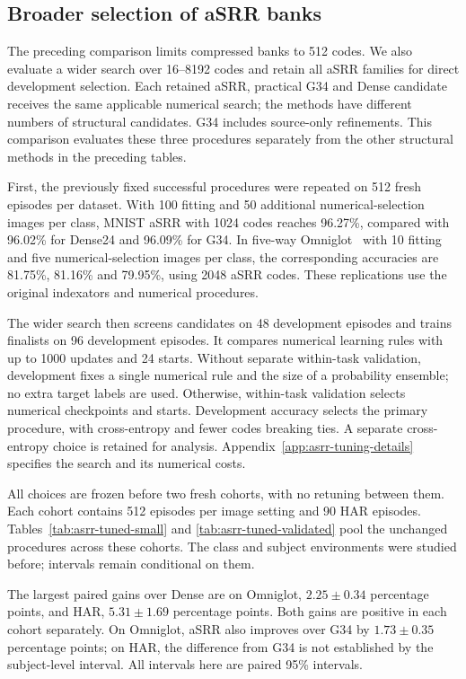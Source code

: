 \FloatBarrier
\subsection{Broader selection of aSRR banks}
\label{sec:asrr-broader}

The preceding comparison limits compressed banks to 512 codes. We also
evaluate a wider search over 16--8192 codes and retain all aSRR families
for direct development selection. Each retained aSRR, practical G34 and
Dense candidate receives the same applicable numerical search; the
methods have different numbers of structural candidates. G34 includes
source-only refinements. This comparison evaluates these three procedures
separately from the other structural methods in the preceding tables.

First, the previously fixed successful procedures were repeated on
512 fresh episodes per dataset. With 100 fitting and 50 additional
numerical-selection images per class, MNIST aSRR with 1024 codes reaches 96.27\%,
compared with 96.02\% for Dense24 and 96.09\% for G34. In five-way
Omniglot~\cite{lake2015human} with 10 fitting and five numerical-selection
images per class,
the corresponding accuracies are 81.75\%, 81.16\% and 79.95\%,
using 2048 aSRR codes.
These replications use the original indexators and numerical procedures.

The wider search then screens candidates on 48 development episodes
and trains finalists on 96 development episodes. It compares numerical
learning rules with up to 1000 updates and 24 starts. Without separate
within-task validation, development fixes a single numerical rule and
the size of a probability ensemble; no extra target labels are used.
Otherwise, within-task validation selects numerical checkpoints and
starts. Development accuracy selects the primary procedure, with
cross-entropy and fewer codes breaking ties. A separate cross-entropy
choice is retained for analysis. Appendix~\ref{app:asrr-tuning-details}
specifies the search and its numerical costs.

All choices are frozen before two fresh cohorts, with no retuning between
them. Each cohort contains 512 episodes per image setting and 90 HAR
episodes. Tables~\ref{tab:asrr-tuned-small} and
\ref{tab:asrr-tuned-validated} pool the unchanged procedures across
these cohorts. The class and subject environments were studied before;
intervals remain conditional on them.

\FloatBarrier

The largest paired gains over Dense are on Omniglot,
$2.25\pm0.34$ percentage points, and HAR, $5.31\pm1.69$ percentage
points. Both gains are positive in each cohort separately. On Omniglot,
aSRR also improves over G34 by $1.73\pm0.35$ percentage points; on HAR,
the difference from G34 is not established by the subject-level interval.
All intervals here are paired 95\% intervals.

